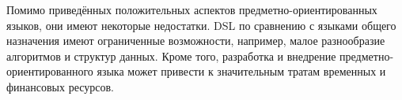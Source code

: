 Помимо приведённых положительных аспектов предметно-ориентированных языков, они имеют некоторые недостатки.
DSL по сравнению с языками общего назначения имеют ограниченные возможности, например, малое разнообразие алгоритмов и структур данных.
Кроме того, разработка и внедрение предметно-ориентированного языка может привести к значительным тратам временных и финансовых ресурсов.

